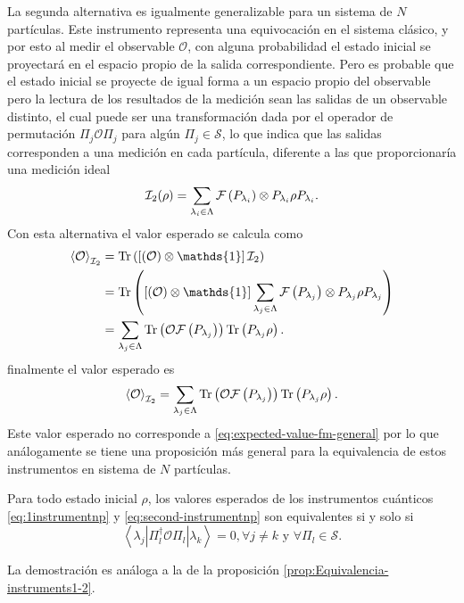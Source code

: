 La segunda alternativa es igualmente generalizable para un sistema de $N$
partículas. Este instrumento representa una equivocación en el sistema clásico,
y por esto al medir el observable $\mathcal{O}$, con alguna probabilidad el
estado inicial se proyectará en el espacio propio de la salida correspondiente.
Pero es probable que el estado inicial se proyecte de igual forma a un espacio
propio del observable pero la lectura de los resultados de la medición sean las
salidas de un observable distinto, el cual puede ser una transformación dada
por el operador de permutación $\Pi_j\mathcal{O}\Pi_j$ para algún $\Pi_j\in
\mathcal{S}$, lo que indica que las salidas corresponden a una medición en cada
partícula, diferente a las que proporcionaría una medición ideal
\begin{equation}\label{eq:second-instrumentnp}
    \mathcal{I}_2(\rho)= \sum_{\lambda_i \in \Lambda } \mathcal{F}\left(P_{\lambda_i}\right)\otimes P_{\lambda_i}\rho P_{\lambda_i}.
\end{equation} 
Con esta alternativa el valor esperado se calcula como 
\begin{equation*}
    \begin{split}
        \left \la \mathcal{O} \right \ra_{\mathcal{I}_2}&=\tr\left( \left[\left(\mathcal{O}\right) \otimes \mathds{1}\right]\mathcal{I}_2\right) \\
        &=\tr\left(\left[ \left(\mathcal{O}\right)\otimes \mathds{1}\right]\sum_{\lambda_j \in \Lambda}\fuzzy{P_{\lambda_j}}\otimes P_{\lambda_j}{\rho}P_{\lambda_j} \right)\\
        &=\sum_{\lambda_j\in \Lambda} \tr\left(\mathcal{O}\fuzzy{P_{\lambda_j}}\right) \tr\left(P_{\lambda_j}\rho\right). \\
    \end{split}
\end{equation*} 
finalmente el valor esperado es \begin{equation}\label{eq:valor-esperado-2instrumentnp}
    \left \langle \mathcal{O}\right \rangle_{\mathcal{I}_2}=\sum_{\lambda_j\in \Lambda} {\rm Tr}\left(\mathcal{O}\mathcal{F}\left(P_{\lambda_j}\right)\right) {\rm Tr}\left(P_{\lambda_j}\rho\right).
\end{equation} 
Este valor esperado no corresponde a {\eqref{eq:expected-value-fm-general}} por
lo que análogamente se tiene una proposición más general para la equivalencia
de estos instrumentos en sistema de $N$ partículas.

\begin{proposition}\label{prop:Equivalencia-instrumentos-np}
    Para todo estado inicial $\rho$, los valores esperados de los instrumentos
cuánticos {\ref{eq:1instrumentnp}} y {\ref{eq:second-instrumentnp}} son
equivalentes si y solo si \[\left \langle \lambda_j \left|\Pi_l^\dagger
\mathcal{O} \Pi_l\right|\lambda_k\right\rangle=0,\forall j\ne k \text{ y }
\forall \Pi_l \in \mathcal{S}.\]
\end{proposition} 
La demostración es análoga a la de la proposición {\ref{prop:Equivalencia-instruments1-2}}.




